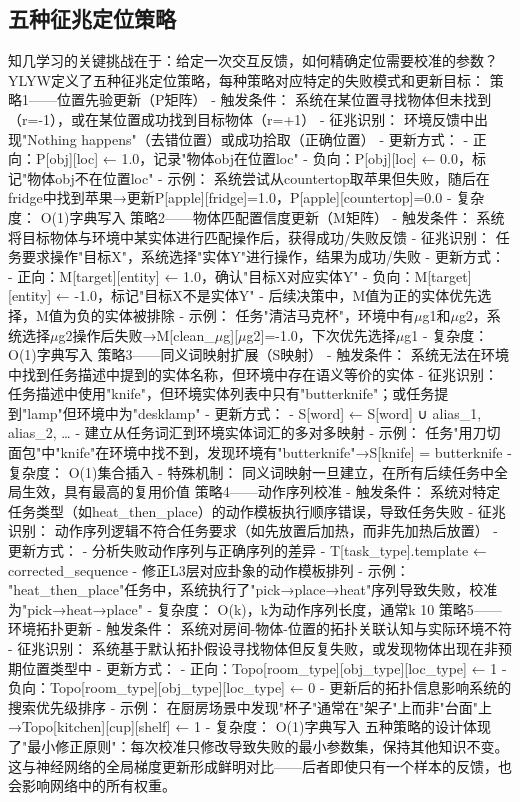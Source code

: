 \documentclass[12pt,a4paper]{article}
\begin{document}
\subsection{五种征兆定位策略}
知几学习的关键挑战在于：给定一次交互反馈，如何精确定位需要校准的参数？YLYW定义了五种征兆定位策略，每种策略对应特定的失败模式和更新目标：
策略1——位置先验更新（P矩阵）
- 触发条件： 系统在某位置寻找物体但未找到（r=-1），或在某位置成功找到目标物体（r=+1）
- 征兆识别： 环境反馈中出现"Nothing happens"（去错位置）或成功拾取（正确位置）
- 更新方式：
- 正向：P[obj][loc] ← 1.0，记录"物体obj在位置loc"
- 负向：P[obj][loc] ← 0.0，标记"物体obj不在位置loc"
- 示例： 系统尝试从countertop取苹果但失败，随后在fridge中找到苹果→更新P[apple][fridge]=1.0，P[apple][countertop]=0.0
- 复杂度： O(1)字典写入
策略2——物体匹配置信度更新（M矩阵）
- 触发条件： 系统将目标物体与环境中某实体进行匹配操作后，获得成功/失败反馈
- 征兆识别： 任务要求操作"目标X"，系统选择"实体Y"进行操作，结果为成功/失败
- 更新方式：
- 正向：M[target][entity] ← 1.0，确认"目标X对应实体Y"
- 负向：M[target][entity] ← -1.0，标记"目标X不是实体Y"
- 后续决策中，M值为正的实体优先选择，M值为负的实体被排除
- 示例： 任务"清洁马克杯"，环境中有$\mu$g1和$\mu$g2，系统选择$\mu$g2操作后失败→M[clean\_$\mu$g][$\mu$g2]=-1.0，下次优先选择$\mu$g1
- 复杂度： O(1)字典写入
策略3——同义词映射扩展（S映射）
- 触发条件： 系统无法在环境中找到任务描述中提到的实体名称，但环境中存在语义等价的实体
- 征兆识别： 任务描述中使用"knife"，但环境实体列表中只有"butterknife"；或任务提到"lamp"但环境中为"desklamp"
- 更新方式：
- S[word] ← S[word] ∪ {alias\_1, alias\_2, …}
- 建立从任务词汇到环境实体词汇的多对多映射
- 示例： 任务"用刀切面包"中"knife"在环境中找不到，发现环境有"butterknife"→S[knife] = {butterknife}
- 复杂度： O(1)集合插入
- 特殊机制： 同义词映射一旦建立，在所有后续任务中全局生效，具有最高的复用价值
策略4——动作序列校准
- 触发条件： 系统对特定任务类型（如heat\_then\_place）的动作模板执行顺序错误，导致任务失败
- 征兆识别： 动作序列逻辑不符合任务要求（如先放置后加热，而非先加热后放置）
- 更新方式：
- 分析失败动作序列与正确序列的差异
- T[task\_type].template ← corrected\_sequence
- 修正L3层对应卦象的动作模板排列
- 示例： "heat\_then\_place"任务中，系统执行了"pick→place→heat"序列导致失败，校准为"pick→heat→place"
- 复杂度： O(k)，k为动作序列长度，通常k  10
策略5——环境拓扑更新
- 触发条件： 系统对房间-物体-位置的拓扑关联认知与实际环境不符
- 征兆识别： 系统基于默认拓扑假设寻找物体但反复失败，或发现物体出现在非预期位置类型中
- 更新方式：
- 正向：Topo[room\_type][obj\_type][loc\_type] ← 1
- 负向：Topo[room\_type][obj\_type][loc\_type] ← 0
- 更新后的拓扑信息影响系统的搜索优先级排序
- 示例： 在厨房场景中发现"杯子"通常在"架子"上而非"台面"上→Topo[kitchen][cup][shelf] ← 1
- 复杂度： O(1)字典写入
五种策略的设计体现了"最小修正原则"：每次校准只修改导致失败的最小参数集，保持其他知识不变。这与神经网络的全局梯度更新形成鲜明对比——后者即使只有一个样本的反馈，也会影响网络中的所有权重。
\end{document}
